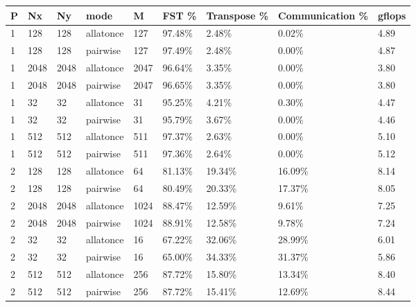 \documentclass[11pt]{article}
\begin{document}
\begin{table}
  \centering
  \begin{adjustbox}{max width=\textwidth, max totalheight=0.95\textheight}
    \begin{tabular}{lllllllll}
      \toprule
      P   & Nx   & Ny   & mode      & M    & FST \%  & Transpose \% & Communication \% & gflops \\
      \midrule
      1   & 128  & 128  & allatonce & 127  & 97.48\% & 2.48\%       & 0.02\%           & 4.89   \\
      1   & 128  & 128  & pairwise  & 127  & 97.49\% & 2.48\%       & 0.00\%           & 4.87   \\
      1   & 2048 & 2048 & allatonce & 2047 & 96.64\% & 3.35\%       & 0.00\%           & 3.80   \\
      1   & 2048 & 2048 & pairwise  & 2047 & 96.65\% & 3.35\%       & 0.00\%           & 3.80   \\
      1   & 32   & 32   & allatonce & 31   & 95.25\% & 4.21\%       & 0.30\%           & 4.47   \\
      1   & 32   & 32   & pairwise  & 31   & 95.79\% & 3.67\%       & 0.00\%           & 4.46   \\
      1   & 512  & 512  & allatonce & 511  & 97.37\% & 2.63\%       & 0.00\%           & 5.10   \\
      1   & 512  & 512  & pairwise  & 511  & 97.36\% & 2.64\%       & 0.00\%           & 5.12   \\
      2   & 128  & 128  & allatonce & 64   & 81.13\% & 19.34\%      & 16.09\%          & 8.14   \\
      2   & 128  & 128  & pairwise  & 64   & 80.49\% & 20.33\%      & 17.37\%          & 8.05   \\
      2   & 2048 & 2048 & allatonce & 1024 & 88.47\% & 12.59\%      & 9.61\%           & 7.25   \\
      2   & 2048 & 2048 & pairwise  & 1024 & 88.91\% & 12.58\%      & 9.78\%           & 7.24   \\
      2   & 32   & 32   & allatonce & 16   & 67.22\% & 32.06\%      & 28.99\%          & 6.01   \\
      2   & 32   & 32   & pairwise  & 16   & 65.00\% & 34.33\%      & 31.37\%          & 5.86   \\
      2   & 512  & 512  & allatonce & 256  & 87.72\% & 15.80\%      & 13.34\%          & 8.40   \\
      2   & 512  & 512  & pairwise  & 256  & 87.72\% & 15.41\%      & 12.69\%          & 8.44   \\

\end{tabular}
\end{adjustbox}
\end{table}
\end{document}

